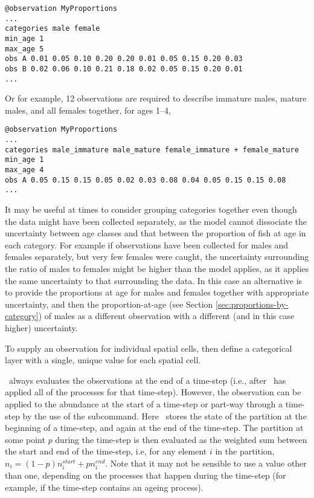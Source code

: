 {\small{\begin{verbatim}
@observation MyProportions
...
categories male female
min_age 1
max_age 5
obs A 0.01 0.05 0.10 0.20 0.20 0.01 0.05 0.15 0.20 0.03
obs B 0.02 0.06 0.10 0.21 0.18 0.02 0.05 0.15 0.20 0.01
...
\end{verbatim}

Or for example, 12 observations are required to describe immature males, mature males, and all females together, for ages 1--4,

{\small{\begin{verbatim}
@observation MyProportions
...
categories male_immature male_mature female_immature + female_mature
min_age 1
max_age 4
obs A 0.05 0.15 0.15 0.05 0.02 0.03 0.08 0.04 0.05 0.15 0.15 0.08
...
\end{verbatim}}}

It may be useful at times to consider grouping categories together even though the data might have been collected separately, as the model cannot dissociate the uncertainty between age classes and that between the proportion of fish at age in each category. For example if observations have been collected for males and females separately, but very few females were caught, the uncertainty surrounding the ratio of males to females might be higher than the model applies, as it applies the same uncertainty to that surrounding the data. In this case an alternative is to provide the proportions at age for males and females together with appropriate uncertainty, and then the proportion-at-age (see Section \ref{sec:proportions-by-category}) of males as a different observation with a different (and in this case higher) uncertainty.

To supply an observation for individual spatial cells, then define a categorical layer with a single, unique value for each spatial cell. 

\TODO

\SPM\ always evaluates the observations at the end of a time-step (i.e., after \SPM\ has applied all of the processes for that time-step). However, the observation can be applied to the abundance at the start of a time-step or part-way through a time-step by the use of the  subcommand. Here \SPM\ stores the state of the partition at the beginning of a time-step, and again at the end of the time-step. The partition at some point $p$ during the time-step is then evaluated as the weighted sum between the start and end of the time-step, i.e, for any element $i$ in the partition, $n_i=(1-p) n_i^{start} + p n_i^{end}$. Note that it may not be sensible to use a value other than one, depending on the processes that happen during the time-step (for example, if the time-step contains an ageing process).

}}
